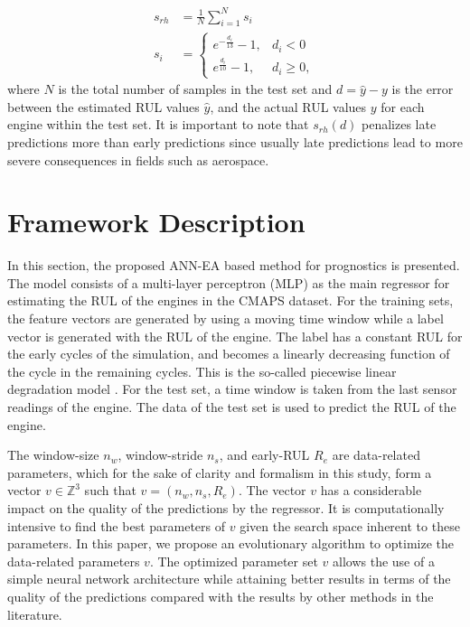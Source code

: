 \documentclass[12pt]{IEEEtran}%
\begin{document}
\begin{align}
s_{rh}  &  = \frac{1}{N} \sum_{i=1}^{N}{s_{i}}\nonumber\\
s_{i}  &  =
\begin{cases}
e^{-\frac{d_{i}}{13}} - 1, & d_{i} < 0\\
e^{\frac{d_{i}}{10}} - 1, & d_{i} \geq0,
\end{cases}
\label{eq:rhs}%
\end{align}
where $N$ is the total number of samples in the test set and $d = \hat{y} - y$
is the error between the estimated RUL values $\hat{y}$, and the actual RUL
values $y$ for each engine within the test set. It is important to note that
$s_{rh}(d)$ penalizes late predictions more than early predictions since
usually late predictions lead to more severe consequences in fields such as aerospace.

\section{Framework Description}

\label{sec:method}

In this section, the proposed ANN-EA based method for prognostics is
presented. The model consists of a multi-layer perceptron (MLP) as the main
regressor for estimating the RUL of the engines in the CMAPS dataset. For the
training sets, the feature vectors are generated by using a moving time window
while a label vector is generated with the RUL of the engine. The label has a
constant RUL for the early cycles of the simulation, and becomes a linearly
decreasing function of the cycle in the remaining cycles. This is the
so-called piecewise linear degradation model \cite{Ramasso2014}. For the test
set, a time window is taken from the last sensor readings of the engine. The
data of the test set is used to predict the RUL of the engine.

The window-size $n_{w}$, window-stride $n_{s}$, and early-RUL $R_{e}$ are
data-related parameters, which for the sake of clarity and formalism in this
study, form a vector $v \in\mathbb{Z}^{3}$ such that $v = (n_{w}, n_{s},
R_{e})$. The vector $v$ has a considerable impact on the quality of the
predictions by the regressor. It is computationally intensive to find the best
parameters of $v$ given the search space inherent to these parameters. In this
paper, we propose an evolutionary algorithm to optimize the data-related
parameters $v$. The optimized parameter set $v$ allows the use of a simple
neural network architecture while attaining better results in terms of the
quality of the predictions compared with the results by other methods in the literature.
\end{document}

